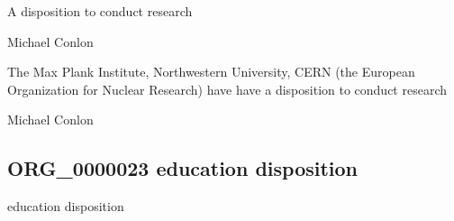 \documentclass[letterpaper,10pt,english]{sphinxmanual}
\begin{document}
\begin{sphinxShadowBox}

\sphinxAtStartPar
{\hyperref[\detokenize{doc-BFO_0000016::doc}]{}}
\end{sphinxShadowBox}

\begin{sphinxShadowBox}

\sphinxAtStartPar
A disposition to conduct research
\end{sphinxShadowBox}

\begin{sphinxShadowBox}

\sphinxAtStartPar
Michael Conlon 
\end{sphinxShadowBox}

\begin{sphinxShadowBox}

\sphinxAtStartPar
The Max Plank Institute, Northwestern University, CERN (the European Organization for Nuclear Research) have have a disposition to conduct research
\end{sphinxShadowBox}

\begin{sphinxShadowBox}

\sphinxAtStartPar
{}
\end{sphinxShadowBox}

\begin{sphinxShadowBox}

\sphinxAtStartPar
Michael Conlon 
\end{sphinxShadowBox}
\begin{quote}

\ignorespaces \end{quote}


\subsection{ORG\_0000023 \sphinxhyphen{} education disposition}
\label{\detokenize{doc-ORG_0000023:org-0000023-education-disposition}}\label{\detokenize{doc-ORG_0000023:index-0}}\label{\detokenize{doc-ORG_0000023::doc}}
\begin{sphinxShadowBox}

\sphinxAtStartPar
education disposition
\end{sphinxShadowBox}
\end{document}
